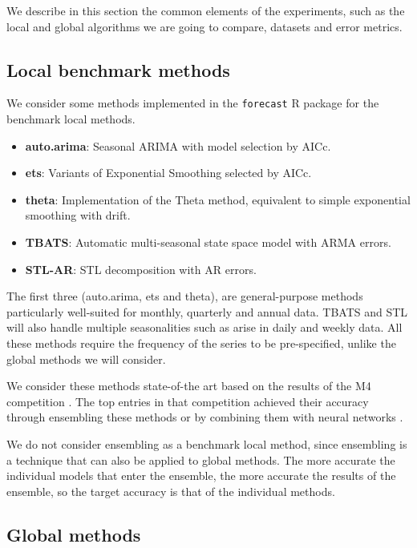 \documentclass[a4paper]{article}
\theoremstyle{custom}
\begin{document}
We describe in this section the common elements of the experiments, such as the local and global algorithms we are going to compare, datasets and error metrics.

\subsection{Local benchmark methods}

We consider some methods implemented in the \texttt{forecast} R package \cite{hyndman2008forecast,Rforecast} for the benchmark local methods.
\begin{itemize}
\item \textbf{auto.arima}: Seasonal ARIMA with model selection by AICc.
\item \textbf{ets}: Variants of Exponential Smoothing selected by AICc.
\item \textbf{theta}: Implementation of the Theta method, equivalent to simple exponential smoothing with drift.
\item \textbf{TBATS}: Automatic multi-seasonal state space model with ARMA errors.
\item \textbf{STL-AR}: STL decomposition with AR errors.
\end{itemize}

The first three (auto.arima, ets and theta), are general-purpose methods particularly well-suited for monthly, quarterly and annual data. TBATS and STL will also handle multiple seasonalities such as arise in daily and weekly data. All these methods require the frequency of the series to be pre-specified, unlike the global methods we will consider.

We consider these methods state-of-the art based on the results of the M4 competition \cite{makridakis2020m4}. The top entries in that competition achieved their accuracy through ensembling these methods \cite{montero2020fforma, pawlikowski2020weighted, jaganathan2020combination} or by combining them with neural networks \cite{smyl2020hybrid}.

We do not consider ensembling as a benchmark local method, since ensembling is a technique that can also be applied to global methods. The more accurate the individual models that enter the ensemble, the more accurate the results of the ensemble, so the target accuracy is that of the individual methods.

\subsection{Global methods}
\end{document}
